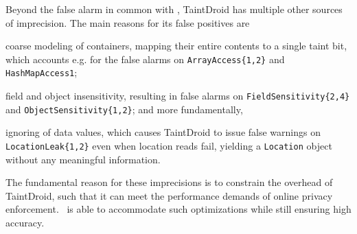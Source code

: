 Beyond the false alarm in common with \Tool, TaintDroid has multiple other sources of imprecision. The main reasons for its false positives are
\begin{compactitem}
	\item coarse modeling of containers, mapping their entire contents to a single taint bit, which accounts e.g. for the false alarms on {\tt ArrayAccess\{1,2\}} and {\tt HashMapAccess1};
	\item field and object insensitivity, resulting in false alarms on {\tt FieldSensitivity\{2,4\}} and {\tt ObjectSensitivity\{1,2\}}; and more fundamentally,
	\item ignoring of data values, which causes TaintDroid to issue false warnings on {\tt LocationLeak\{1,2\}} even when location reads fail, yielding a {\tt Location} object without any meaningful information.
\end{compactitem}
The fundamental reason for these imprecisions is to constrain the overhead of TaintDroid, such that it can meet the performance demands of online privacy enforcement. \Tool\ is able to accommodate such optimizations while still ensuring high accuracy. 